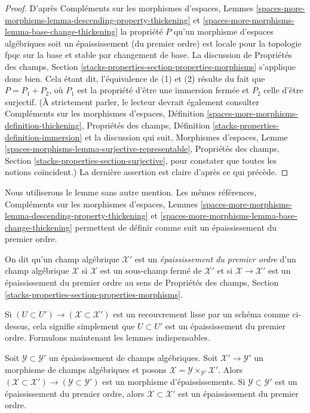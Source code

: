 \begin{proof}
D'après Compléments sur les morphismes d'espaces, Lemmes
\ref{spaces-more-morphisms-lemma-descending-property-thickening} et
\ref{spaces-more-morphisms-lemma-base-change-thickening}
la propriété $P$ qu'un morphisme d'espaces algébriques soit un
épaississement (du premier ordre) est locale pour la topologie fpqc sur la base et stable par
changement de base. La discussion de Propriétés des champs, Section
\ref{stacks-properties-section-properties-morphisms} s'applique donc bien.
Cela étant dit, l'équivalence de (1) et (2) résulte du
fait que $P = P_1 + P_2$, où $P_1$ est la propriété d'être
une immersion fermée et $P_2$ celle d'être surjectif.
(À strictement parler, le lecteur devrait également consulter
Compléments sur les morphismes d'espaces, Définition
\ref{spaces-more-morphisms-definition-thickening},
Propriétés des champs, Définition \ref{stacks-properties-definition-immersion}
et la discussion qui suit, Morphismes d'espaces, Lemme
\ref{spaces-morphisms-lemma-surjective-representable},
Propriétés des champs, Section \ref{stacks-properties-section-surjective},
pour constater que toutes les notions coïncident.)
La dernière assertion est claire d'après ce qui précède.
\end{proof}

\noindent
Nous utiliserons le lemme sans autre mention. Les mêmes références,
Compléments sur les morphismes d'espaces, Lemmes
\ref{spaces-more-morphisms-lemma-descending-property-thickening} et
\ref{spaces-more-morphisms-lemma-base-change-thickening}
permettent de définir comme suit un épaississement du premier ordre.

\begin{definition}
\label{definition-first-order-thickening}
On dit qu'un champ algébrique $\mathcal{X}'$ est un {\it épaississement du premier ordre}
d'un champ algébrique $\mathcal{X}$ si $\mathcal{X}$ est un sous-champ fermé
de $\mathcal{X}'$ et si $\mathcal{X} \to \mathcal{X}'$ est un épaississement
du premier ordre au sens de Propriétés des champs, Section
\ref{stacks-properties-section-properties-morphisms}.
\end{definition}

\noindent
Si $(U \subset U') \to (\mathcal{X} \subset \mathcal{X}')$ est un
recouvrement lisse par un schéma comme ci-dessus, cela signifie simplement que $U \subset U'$
est un épaississement du premier ordre. Formulons maintenant les lemmes indispensables.

\begin{lemma}
\label{lemma-base-change-thickening}
Soit $\mathcal{Y} \subset \mathcal{Y}'$ un épaississement de champs algébriques.
Soit $\mathcal{X}' \to \mathcal{Y}'$ un morphisme de champs algébriques
et posons $\mathcal{X} = \mathcal{Y} \times_{\mathcal{Y}'} \mathcal{X}'$.
Alors
$(\mathcal{X} \subset \mathcal{X}') \to (\mathcal{Y} \subset \mathcal{Y}')$
est un morphisme d'épaississements. Si $\mathcal{Y} \subset \mathcal{Y}'$ est un
épaississement du premier ordre, alors $\mathcal{X} \subset \mathcal{X}'$ est un
épaississement du premier ordre.
\end{lemma}

